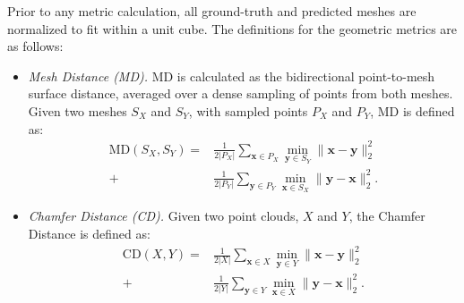 \documentclass[10pt,twocolumn,letterpaper]{article}
\begin{document}
Prior to any metric calculation, all ground-truth and predicted meshes are normalized to fit within a unit cube. The definitions for the geometric metrics are as follows:
\begin{itemize}[leftmargin=2em]
    \item \emph{Mesh Distance (MD).} MD is calculated as the bidirectional point-to-mesh surface distance, averaged over a dense sampling of points from both meshes. Given two meshes $S_X$ and $S_Y$, with sampled points $P_X$ and $P_Y$, MD is defined as:
    \begin{equation}
    \begin{split}
    \text{MD}(S_X, S_Y) = &\frac{1}{2|P_X|} \sum_{\boldsymbol{x} \in P_X} \min_{\boldsymbol{y} \in S_Y} \|\boldsymbol{x} - \boldsymbol{y}\|_2^2 
    \\ + &\frac{1}{2|P_Y|} \sum_{\boldsymbol{y} \in P_Y} \min_{\boldsymbol{x} \in S_X} \|\boldsymbol{y} - \boldsymbol{x}\|^2_2.
    \end{split}
    \label{eq:mesh_distance}
    \end{equation}

    \item \emph{Chamfer Distance (CD).} Given two point clouds, $X$ and $Y$, the Chamfer Distance is defined as:
    \begin{equation}
    \begin{split}
        \text{CD}(X,Y) = &\frac{1}{2|X|}\sum_{\boldsymbol{x}\in{X}}\min_{\boldsymbol{y}\in{Y}}\|\boldsymbol{x}-\boldsymbol{y}\|_2^2
        \\+ &\frac{1}{2|{Y}|}\sum_{\boldsymbol{y}\in{Y}}\min_{\boldsymbol{x}\in{X}}\|\boldsymbol{y}-\boldsymbol{x}\|_2^2.
    \end{split}
    \end{equation}


\end{itemize}
\end{document}
